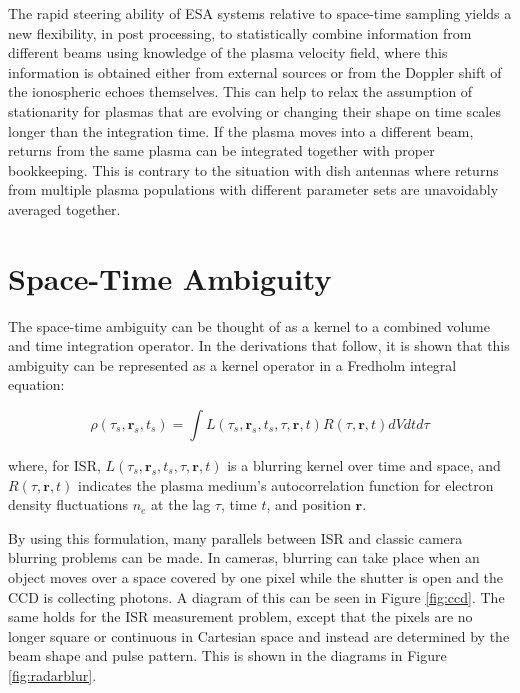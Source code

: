 The rapid steering ability of ESA systems relative to space-time sampling yields a new flexibility, in post processing, to statistically combine information from different beams using knowledge of the plasma velocity field, where this information is obtained either from external sources or from the Doppler shift of the ionospheric echoes themselves. This can help to relax the assumption of stationarity for plasmas that are evolving or changing their shape on time scales longer than the integration time. If the plasma moves into a different beam, returns from the same plasma can be integrated together with proper bookkeeping. This is contrary to the situation with dish antennas where returns from multiple plasma populations with different parameter sets are unavoidably averaged together.


\section{Space-Time Ambiguity}
\label{sec:sptimeamb}

The space-time ambiguity can be thought of as a kernel to a combined volume and time integration operator. In the derivations that follow, it is shown that this ambiguity can be represented as a kernel operator in a Fredholm integral equation:

\begin{equation}
\label{eqn:friedholm}
\rho(\tau_s ,\mathbf{r}_{s},t_s) = \int L(\tau_s, \mathbf{r}_{s},t_s,\tau,\mathbf{r},t) R(\tau,\mathbf{r},t) dVd t d\tau
\end{equation}

\noindent where, for ISR, $L(\tau_s, \mathbf{r}_{s},t_s,\tau,\mathbf{r},t) $ is a blurring kernel over time and space, and $R(\tau,\mathbf{r},t) $ indicates the plasma medium's autocorrelation function  for electron density fluctuations $n_e$ at the lag $\tau$, time $t$, and position $\mathbf{r}$.

By using this formulation, many parallels between ISR and classic camera blurring problems can be made. In cameras, blurring can take place when an object moves over a space covered by one pixel while the shutter is open and the CCD is collecting photons. A diagram of this can be seen in Figure \ref{fig:ccd}. The same holds for the ISR measurement problem, except that the pixels are no longer square or continuous in Cartesian space and instead are determined by the beam shape and pulse pattern. This is shown in the diagrams in Figure \ref{fig:radarblur}.


